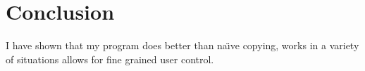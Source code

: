 \documentclass[12pt]{article}
\begin{document}
\newpage
\section{Conclusion}
I have shown that my program does better than na\"{\i}ve copying,
works in a variety of situations allows for fine grained user control.

\end{document}
